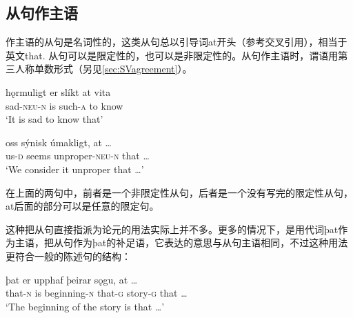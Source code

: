 \subsection{从句作主语}
作主语的从句是名词性的，这类从句总以引导词at开头（参考交叉引用），相当于英文that. 从句可以是限定性的，也可以是非限定性的。从句作主语时，谓语用第三人称单数形式（另见\ref{sec:SVagreement}）。
\begin{exe}
    \ex
    \gll hǫrmuligt	er	slíkt	at	vita\\
    sad-\textsc{neu}-\textsc{n}	is	such-\textsc{a}	to	know\\
    \trans `It is sad to know that’

    \ex
    \gll oss	sýnisk	úmakligt,	at	…\\
    us-\textsc{d}	seems	unproper-\textsc{neu}-\textsc{n}	that	…\\
    \trans `We consider it unproper that …’
\end{exe}

在上面的两句中，前者是一个非限定性从句，后者是一个没有写完的限定性从句，at后面的部分可以是任意的限定句。

这种把从句直接指派为论元的用法实际上并不多。更多的情况下，是用代词þat作为主语，把从句作为þat的补足语，它表达的意思与从句主语相同，不过这种用法更符合一般的陈述句的结构：
\begin{exe}
    \ex
    \gll þat	er	upphaf	þeirar	sǫgu,	at	…\\
    that-\textsc{n}	is	beginning-\textsc{n}	that-\textsc{g}	story-\textsc{g}	that	…\\
    \trans `The beginning of the story is that …’
\end{exe}

